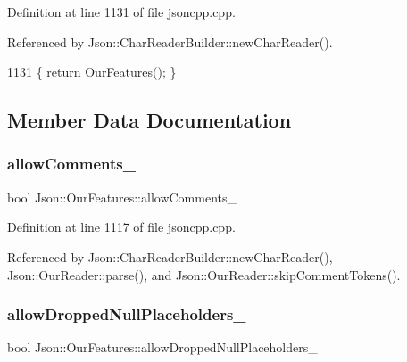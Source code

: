 Definition at line 1131 of file jsoncpp.\+cpp.



Referenced by Json\+::\+Char\+Reader\+Builder\+::new\+Char\+Reader().


\begin{DoxyCode}
1131 \{ \textcolor{keywordflow}{return} OurFeatures(); \}
\end{DoxyCode}


\subsection{Member Data Documentation}
\mbox{\label{class_json_1_1_our_features_ac71bb7ba7363d3b05ed76602b036ce33}} 
\subsubsection{\texorpdfstring{allow\+Comments\+\_\+}{allowComments\_}}
{\footnotesize\ttfamily bool Json\+::\+Our\+Features\+::allow\+Comments\+\_\+}



Definition at line 1117 of file jsoncpp.\+cpp.



Referenced by Json\+::\+Char\+Reader\+Builder\+::new\+Char\+Reader(), Json\+::\+Our\+Reader\+::parse(), and Json\+::\+Our\+Reader\+::skip\+Comment\+Tokens().

\mbox{\label{class_json_1_1_our_features_a13963bc44bf948eec1968f7ff8e8f5f1}} 
\subsubsection{\texorpdfstring{allow\+Dropped\+Null\+Placeholders\+\_\+}{allowDroppedNullPlaceholders\_}}
{\footnotesize\ttfamily bool Json\+::\+Our\+Features\+::allow\+Dropped\+Null\+Placeholders\+\_\+}



